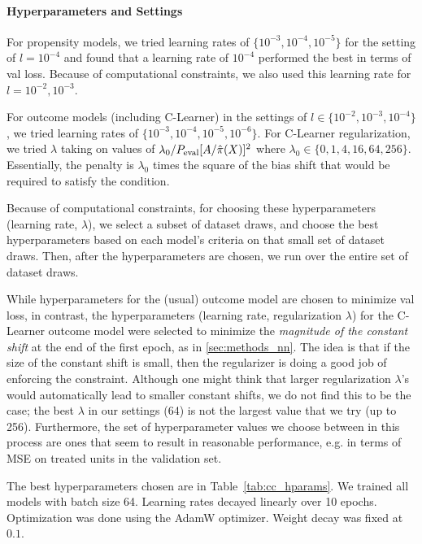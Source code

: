\paragraph{Hyperparameters and Settings} 
For propensity models, we tried learning rates of $\{10^{-3},10^{-4},10^{-5}\}$
for the setting of $l=10^{-4}$ and found that a learning rate of $10^{-4}$ performed the best in terms of val loss. Because of computational constraints, we also used this learning rate for $l=10^{-2},10^{-3}$. 

For outcome models (including C-Learner) in the settings of $l\in\{10^{-2},10^{-3},10^{-4}\}$, we tried learning rates of $\{10^{-3},10^{-4},10^{-5},10^{-6}\}$. 
For C-Learner regularization, we tried $\lambda$ taking on values of $\lambda_0 / P_{\rm eval}[A/\hat\pi(X)]^2$ where $\lambda_0\in\{0,1,4,16,64,256\}$. 
Essentially, the penalty is $\lambda_0$ times the square of the bias shift that would be required to satisfy the condition. 

Because of computational constraints, for choosing these hyperparameters (learning rate, $\lambda$), we select a subset of dataset draws, and choose the best hyperparameters based on each model's criteria on that small set of dataset draws. Then, after the hyperparameters are chosen, we run over the entire set of dataset draws. 

While hyperparameters for the (usual) outcome model are chosen to minimize val loss, in contrast, the hyperparameters (learning rate, regularization $\lambda$) for the C-Learner outcome model were selected to minimize the \emph{magnitude of the constant shift} at the end of the first epoch, as in \cref{sec:methods_nn}. 
The idea is that if the size of the constant shift is small, then the regularizer is doing a good job of enforcing the constraint. 
Although one might think that larger regularization $\lambda$'s would automatically lead to smaller constant shifts, we do not find this to be the case; the best $\lambda$ in our settings (64) is not the largest value that we try (up to 256). 
Furthermore, the set of hyperparameter values we choose between in this process are ones that seem to result in reasonable performance, e.g. in terms of MSE on treated units in the validation set. 


The best hyperparameters chosen are in Table~\ref{tab:cc_hparams}. 
We trained all models with batch size 64. Learning rates decayed linearly over 10 epochs. Optimization was done using the AdamW optimizer. Weight decay was fixed at $0.1$. 

